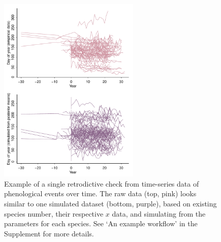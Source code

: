 \documentclass[11pt]{article}
\begin{document}
\begin{figure}[ht]
\centering
\noindent \includegraphics[width=0.6\textwidth]{examples/synchrony/graphs/rawvsonepredictivecheck.pdf}
\caption{Example of a single retrodictive check from time-series data of phenological events over time. The raw data (top, pink) looks similar to one simulated dataset (bottom, purple), based on existing species number, their respective $x$ data, and simulating from the parameters for each species. See `An example workflow' in the Supplement for more details.}
\label{fig:retrodictivecheck}
\end{figure}
\end{document}
